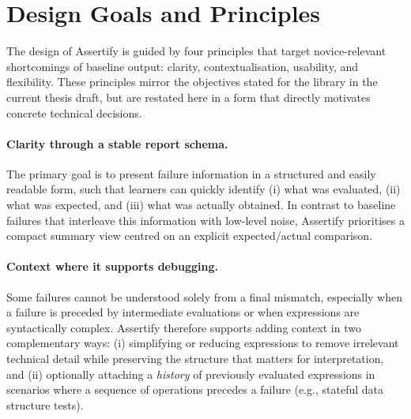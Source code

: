 \section{Design Goals and Principles} %
\label{sctn:design-goals-and-principles} %


\improve


\begin{justify}
The design of Assertify is guided by four principles that target novice-relevant
shortcomings of baseline output: clarity, contextualisation, usability, and
flexibility. These principles mirror the objectives stated for the library in
the current thesis draft, but are restated here in a form that directly
motivates concrete technical decisions.
\end{justify}


\paragraph{Clarity through a stable report schema.}%
\label{par:clarity-through-a-stable-report-schema} The primary goal is
to present failure information in a structured and easily readable form, such
that learners can quickly identify (i) what was evaluated, (ii) what was
expected, and (iii) what was actually obtained. In contrast to baseline failures
that interleave this information with low-level noise, Assertify prioritises a
compact summary view centred on an explicit expected/actual comparison.


\paragraph{Context where it supports debugging.}%
\label{par:context-where-it-supports-debugging} Some failures cannot be
understood solely from a final mismatch, especially when a failure is preceded
by intermediate evaluations or when expressions are syntactically complex.
Assertify therefore supports adding context in two complementary ways: (i)
simplifying or reducing expressions to remove irrelevant technical detail while
preserving the structure that matters for interpretation, and (ii) optionally
attaching a \emph{history} of previously evaluated expressions in scenarios
where a sequence of operations precedes a failure (e.g., stateful data structure
tests).


